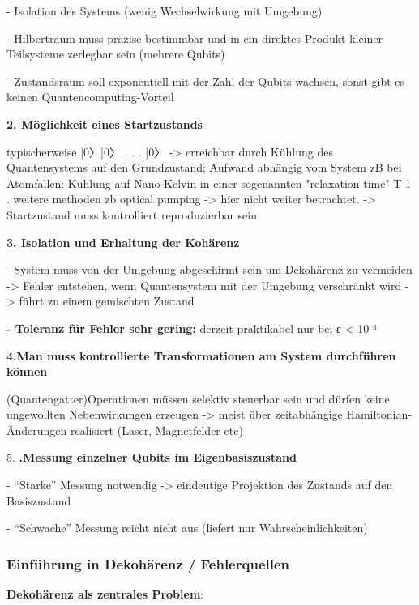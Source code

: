 - Isolation des Systems (wenig Wechselwirkung mit Umgebung) 

- Hilbertraum muss präzise bestimmbar und in ein direktes Produkt kleiner Teilsysteme zerlegbar sein (mehrere Qubits) 

- Zustandsraum soll exponentiell mit der Zahl der Qubits wachsen, sonst gibt es keinen Quantencomputing-Vorteil 

\textbf{{2. Möglichkeit eines Startzustands} }

typischerweise |0〉|0〉 . . . |0〉 \cite{lapierre_introduction_2021} -> erreichbar durch Kühlung des Quantensystems auf den Grundzustand; Aufwand abhängig vom System zB bei Atomfallen: Kühlung auf Nano-Kelvin 
in einer sogenannten "relaxation time" T 1 . weitere methoden zb optical pumping -> hier nicht weiter betrachtet. 
-> Startzustand muss kontrolliert reproduzierbar sein 

\textbf{3. Isolation und Erhaltung der Kohärenz} 

- System muss von der Umgebung abgeschirmt sein um Dekohärenz zu vermeiden -> Fehler entstehen, wenn Quantensystem mit der Umgebung verschränkt wird -> führt zu einem gemischten Zustand 

\textbf{- Toleranz für Fehler sehr gering: }derzeit praktikabel nur bei ε < 10⁻⁶ 

\textbf{4.Man muss kontrollierte Transformationen am System durchführen können} 

(Quantengatter)Operationen müssen selektiv steuerbar sein und dürfen keine ungewollten Nebenwirkungen erzeugen -> meist über zeitabhängige Hamiltonian-Änderungen realisiert (Laser, Magnetfelder etc) 

5. \textbf{.Messung einzelner Qubits im Eigenbasiszustand} 

- “Starke” Messung notwendig -> eindeutige Projektion des Zustands auf den Basiszustand 

- “Schwache” Messung reicht nicht aus (liefert nur Wahrscheinlichkeiten) 

\cite{divincenzo_topics_nodate}
 
\subsubsection{Einführung in Dekohärenz / Fehlerquellen}

\textbf{Dekohärenz als zentrales Problem}: 

